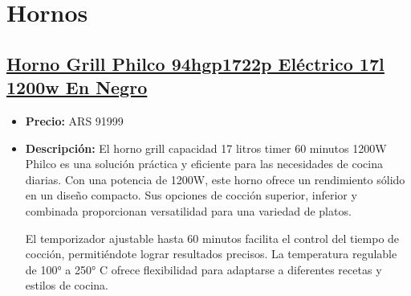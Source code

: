 \documentclass{article}
\begin{document}
\section*{Hornos}
\setcounter{subsection}{0} %

\begin{adjustwidth}{2em}{}

\subsection{\uline{\href{https://www.mercadolibre.com.ar/horno-grill-philco-94hgp1722p-electrico-17l-1200w-en-negro/p/MLA27820218}{Horno Grill Philco 94hgp1722p Eléctrico 17l 1200w En Negro}}}
\begin{itemize}
    \item \textbf{Precio:} ARS 91999
    \item \textbf{Descripción:} El horno grill capacidad 17 litros timer 60 minutos 1200W Philco es una solución práctica y eficiente para las necesidades de cocina diarias. Con una potencia de 1200W, este horno ofrece un rendimiento sólido en un diseño compacto. Sus opciones de cocción superior, inferior y combinada proporcionan versatilidad para una variedad de platos.

El temporizador ajustable hasta 60 minutos facilita el control del tiempo de cocción, permitiéndote lograr resultados precisos. La temperatura regulable de 100° a 250° C ofrece flexibilidad para adaptarse a diferentes recetas y estilos de cocina.


\end{itemize}
\end{adjustwidth}
\end{document}
